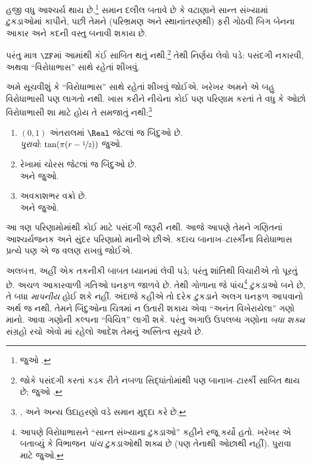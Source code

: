હજી વધુ આશ્ચર્ય થાય છે.\footnote{જુઓ
\citet[Theorem 3.12]{Wagon2016}.}
સમાન દલીલ બતાવે છે કે વટાણાને
સાન્ત સંખ્યામાં ટુકડાઓમાં કાપીને,
પછી તેમને (પરિભ્રમણ અને સ્થાનાંતરણથી)
ફરી ગોઠવી બિગ બેનના આકાર અને
કદની વસ્તુ બનાવી શકાય છે.

પરંતુ માત્ર $\ZF$માં આમાંથી
કંઈ સાબિત થતું નથી.\footnote{જોકે
પસંદગી કરતાં કડક રીતે નબળા
સિદ્ધાંતોમાંથી પણ બાનાખ--ટાર્સ્કી
સાબિત થાય છે; જુઓ
\citet[303]{Wagon2016}.}
તેથી નિર્ણય લેવો પડે: પસંદગી નકારવી,
અથવા ``વિરોધાભાસ'' સાથે રહેતાં
શીખવું.

અમે સૂચવીશું કે ``વિરોધાભાસ''
સાથે રહેતાં શીખવું જોઈએ. ખરેખર
અમને એ બહુ વિરોધાભાસી પણ લાગતો
નથી. ખાસ કરીને નીચેના કોઈ પણ
પરિણામ કરતાં તે વધુ કે ઓછો
વિરોધાભાસી શા માટે હોય તે સમજાતું
નથી:\footnote{\citet[276--7]{Potter2004},
\citet[16]{Weston2003} અને
\citet[31, 308--9]{Wagon2016}
અન્ય ઉદાહરણો વડે સમાન મુદ્દા કરે છે.}
\begin{enumerate}
	\item $(0,1)$ અંતરાલમાં $\Real$ જેટલાં જ બિંદુઓ છે.
	\\\emph{પુરાવો}: $\tan(\pi(r-\nicefrac{1}{2}))$ જુઓ.
	\item રેખામાં ચોરસ જેટલાં જ બિંદુઓ છે.
	\\ અને
	 જુઓ.
	\item અવકાશભર વક્રો છે.
	\\ અને
	 જુઓ.
\end{enumerate}
આ ત્રણ પરિણામોમાંથી કોઈ માટે
પસંદગી જરૂરી નથી. આજે આપણે
તેમને ગણિતનાં આશ્ચર્યજનક અને
સુંદર પરિણામો માનીએ છીએ.
કદાચ બાનાખ--ટાર્સ્કીના વિરોધાભાસ
પ્રત્યે પણ એ જ વલણ રાખવું જોઈએ.

અલબત્ત, અહીં એક તકનીકી બાબત
ધ્યાનમાં લેવી પડે; પરંતુ શાંતિથી
વિચારીએ તો પૂરતું છે. અચળ આકારવાળી
ગતિઓ ઘનફળ જાળવે છે. તેથી ગોળાના
જે પાંચ\footnote{આપણે વિરોધાભાસને
``સાન્ત સંખ્યાના ટુકડાઓ'' કહીને
રજૂ કર્યો હતો. ખરેખર
\citet{Robinson1947}એ બતાવ્યું
કે વિભાજન \emph{પાંચ} ટુકડાઓથી
શક્ય છે (પણ તેનાથી ઓછાથી નહીં).
પુરાવા માટે \citet[pp.~66--7]{Wagon2016}
જુઓ.} ટુકડાઓ બને છે, તે બધા
\emph{માપનીય} હોઈ શકે નહીં.
અંદાજે કહીએ તો દરેક ટુકડાને અલગ
ઘનફળ આપવાનો અર્થ જ નથી. તેમને
બિંદુઓના ચિત્રમાં ન ઉતારી શકાય
એવા ``અનંત વિખેરાયેલા'' ગણો માનો.
આવા ગણોની કલ્પના ``વિચિત્ર'' લાગી
શકે. પરંતુ અગાઉ ઉપલબ્ધ ગણોના
\emph{બધા શક્ય} સંગ્રહો રચો એવો
\stagesacc{}માં રહેલો આદેશ તેમનું
અસ્તિત્વ સૂચવે છે.


